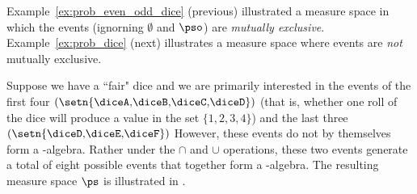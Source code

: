 Example~\ref{ex:prob_even_odd_dice} (previous) illustrated a
measure space in which the events (ignorning $\emptyset$ and $\pso$)
are {\em mutually exclusive}.
Example~\ref{ex:prob_dice} (next) illustrates a measure space
where events are {\em not} mutually exclusive.
\begin{example}
\label{ex:prob_dice}
Suppose we have a ``fair" dice and we are primarily interested in the
events of the first four
$\left(\setn{\text{\diceA,\diceB,\diceC,\diceD}}\right)$
(that is, whether one roll of the dice will produce
a value in the set $\{1,2,3,4\}$)
and the last three
$\left(\setn{\text{\diceD,\diceE,\diceF}}\right)$
However, these events do not by themselves form a \txsigma-algebra.
Rather under the $\cap$ and $\cup$ operations, these two events generate
a total of eight possible events that together form a \txsigma-algebra.
The resulting measure space $\ps$ is illustrated in .
\end{example}
